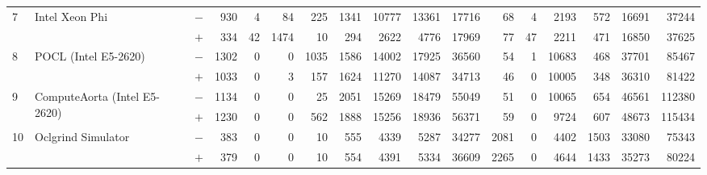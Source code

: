 \begin{tabular}{lll | rrrrrrr | rrrrrrr }
\hline
\multirow{ 2}{*}{7} & \multirow{ 2}{*}{Intel Xeon Phi} & $-$ & 930 & 4 & 84 & 225 & 1341 & 10777 & 13361       & 17716 & 68 & 4 & 2193 & 572 & 16691 & 37244 \\& & $+$ & 334 & 42 & 1474 & 10 & 294 & 2622 & 4776 & 17969 & 77 & 47 & 2211 & 471 & 16850 & 37625 \\
\hline
\multirow{ 2}{*}{8} & \multirow{ 2}{*}{POCL (Intel E5-2620)} & $-$ & 1302 & 0 & 0 & 1035 & 1586 & 14002 & 17925       & 36560 & 54 & 1 & 10683 & 468 & 37701 & 85467 \\& & $+$ & 1033 & 0 & 3 & 157 & 1624 & 11270 & 14087 & 34713 & 46 & 0 & 10005 & 348 & 36310 & 81422 \\
\hline
\multirow{ 2}{*}{9} & \multirow{ 2}{*}{ComputeAorta (Intel E5-2620)} & $-$ & 1134 & 0 & 0 & 25 & 2051 & 15269 & 18479       & 55049 & 51 & 0 & 10065 & 654 & 46561 & 112380 \\& & $+$ & 1230 & 0 & 0 & 562 & 1888 & 15256 & 18936 & 56371 & 59 & 0 & 9724 & 607 & 48673 & 115434 \\
\hline
\multirow{ 2}{*}{10} & \multirow{ 2}{*}{Oclgrind Simulator} & $-$ & 383 & 0 & 0 & 10 & 555 & 4339 & 5287       & 34277 & 2081 & 0 & 4402 & 1503 & 33080 & 75343 \\& & $+$ & 379 & 0 & 0 & 10 & 554 & 4391 & 5334 & 36609 & 2265 & 0 & 4644 & 1433 & 35273 & 80224 \\
  \bottomrule
\end{tabular}

